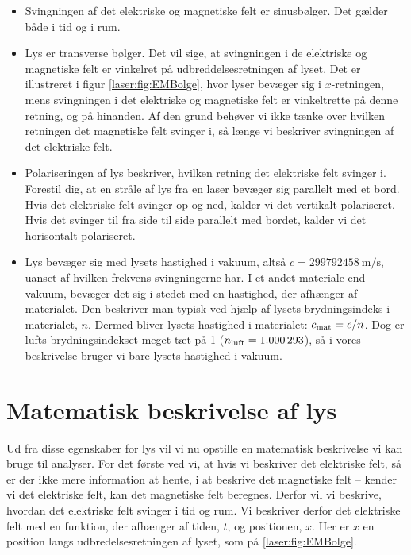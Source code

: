 \documentclass[crop=false, class=memoir]{standalone}
\begin{document}
\begin{itemize}
    \item Svingningen af det elektriske og magnetiske felt er sinusbølger. Det gælder både i tid og i rum.
    \item Lys er transverse bølger. Det vil sige, at svingningen i de elektriske og magnetiske felt er vinkelret på udbreddelsesretningen af lyset. Det er illustreret i figur \ref{laser:fig:EMBolge}, hvor lyser bevæger sig i $x$-retningen, mens svingningen i det elektriske og magnetiske felt er vinkeltrette på denne retning, og på hinanden. Af den grund behøver vi ikke tænke over hvilken retningen det magnetiske felt svinger i, så længe vi beskriver svingningen af det elektriske felt.
    \item Polariseringen af lys beskriver, hvilken retning det elektriske felt svinger i. Forestil dig, at en stråle af lys fra en laser bevæger sig parallelt med et bord. Hvis det elektriske felt svinger op og ned, kalder vi det vertikalt polariseret. Hvis det svinger til fra side til side parallelt med bordet, kalder vi det horisontalt polariseret.
    \item Lys bevæger sig med lysets hastighed i vakuum, altså $c = \SI{299792458}{\metre\per\second}$, uanset af hvilken frekvens  svingningerne har. I et andet materiale end vakuum, bevæger det sig i stedet med en hastighed, der afhænger af materialet. Den beskriver man typisk ved hjælp af lysets brydningsindeks i materialet, $n$. Dermed bliver lysets hastighed i materialet: $c_\textup{mat} = c/n$. Dog er lufts brydningsindekset meget tæt på 1 ($n_\textup{luft} = \num{1.000293}$), så i vores beskrivelse bruger vi bare lysets hastighed i vakuum.
\end{itemize}

\section{Matematisk beskrivelse af lys} \label{laser:sec:mat_lys}
Ud fra disse egenskaber for lys vil vi nu opstille en matematisk beskrivelse vi kan bruge til analyser. For det første ved vi, at hvis vi beskriver det elektriske felt, så er der ikke mere information at hente, i at beskrive det magnetiske felt -- kender vi det elektriske felt, kan det magnetiske felt beregnes. Derfor vil vi beskrive, hvordan det elektriske felt svinger i tid og rum. Vi beskriver derfor det elektriske felt med en funktion, der afhænger af tiden, $t$, og positionen, $x$. Her er $x$ en position langs udbredelsesretningen af lyset, som på \cref{laser:fig:EMBolge}.
\end{document}
